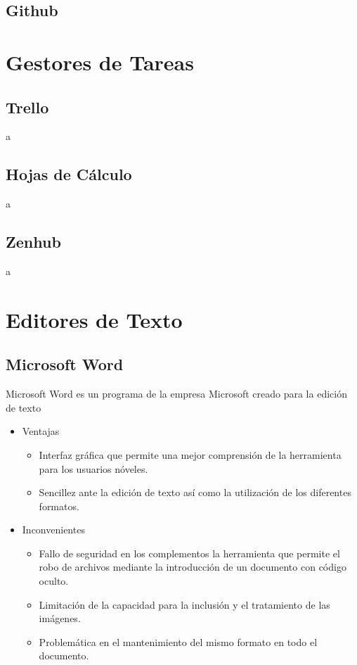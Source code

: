 \subsection{Github}

\section{Gestores de Tareas}
\subsection{Trello}
a
\subsection{Hojas de Cálculo}
a
\subsection{Zenhub}
a
\section{Editores de Texto}
\subsection{Microsoft Word}
Microsoft Word es un programa de la empresa Microsoft creado para la edición de texto\cite{wiki:Word}
\begin{itemize}
\item Ventajas
\begin{itemize}
\item Interfaz gráfica que permite una mejor comprensión de la herramienta para los usuarios nóveles. \nocite{elblogdel1:Word}
\item Sencillez ante la edición de texto así como la utilización de los diferentes formatos.
\end{itemize}
\end{itemize}
\begin{itemize}
\item Inconvenientes
\begin{itemize}
\item Fallo de seguridad en los complementos la herramienta que permite el robo de archivos mediante la introducción de un documento con código oculto.\cite{monografias:Word}
\item Limitación de la capacidad para la inclusión y el tratamiento de las imágenes.
\item Problemática en el mantenimiento del mismo formato en todo el documento.
\end{itemize}
\end{itemize}
